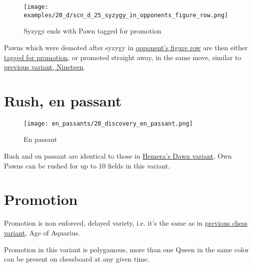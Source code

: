 \vspace*{-1.2\baselineskip}
\noindent
\begin{figure}[!h]
\texttt{[image: examples/20\_d/scn\_d\_25\_syzygy\_in\_opponents\_figure\_row.png]}
\caption{Syzygy ends with Pawn tagged for promotion}
\label{fig:scn_d_25_syzygy_in_opponents_figure_row}
\end{figure}

Pawns which were demoted after syzygy in
\hyperref[sec:Terms/Figure row]{opponent's figure row}
are then either \hyperref[sec:Age of Aquarius/Promotion]{tagged for promotion},
or promoted straight away, in the same move, similar to
\hyperref[fig:scn_n_11_teleport_pawns_init]{previous variant, Nineteen}.

\clearpage %

\section*{Rush, en passant}

\vspace*{-1.2\baselineskip}
\noindent
\begin{figure}[!h]
\texttt{[image: en\_passants/20\_discovery\_en\_passant.png]}
\caption{En passant}
\label{fig:20_discovery_en_passant}
\end{figure}

Rush and en passant are identical to those in \hyperref[fig:14_hemera_s_dawn_en_passant]{Hemera's Dawn variant}.
Own Pawns can be rushed for up to 10 fields in this variant.

\clearpage %

\section*{Promotion}

Promotion is non enforced, delayed variety, i.e. it's the same as in
\hyperref[sec:Age of Aquarius/Promotion]{previous chess variant}, Age of Aquarius.

Promotion in this variant is polygamous, more than one Queen in the same color
can be present on chessboard at any given time.

